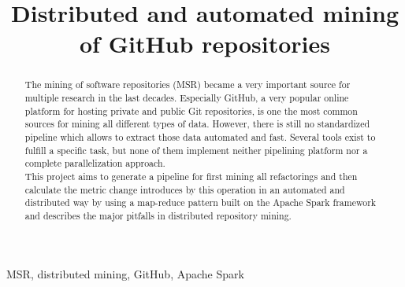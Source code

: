 \documentclass[conference]{IEEEtran}
\begin{document}
\title{Distributed and automated mining of GitHub repositories}

\author{
}

\maketitle

\begin{abstract}
The mining of software repositories (MSR) became a very important source for multiple research in the last decades. Especially GitHub, a very popular online platform for hosting private and public Git repositories, is one the most common sources for mining all different types of data. However, there is still no standardized pipeline which allows to extract those data automated and fast. Several tools exist to fulfill a specific task, but none of them implement neither pipelining platform nor a complete parallelization approach.\\
This project aims to generate a pipeline for first mining all refactorings and then calculate the metric change introduces by this operation in an automated and distributed way by using a map-reduce pattern built on the Apache Spark framework and describes the major pitfalls in distributed repository mining.
\end{abstract}

\begin{IEEEkeywords}
MSR, distributed mining, GitHub, Apache Spark
\end{IEEEkeywords}
\end{document}
